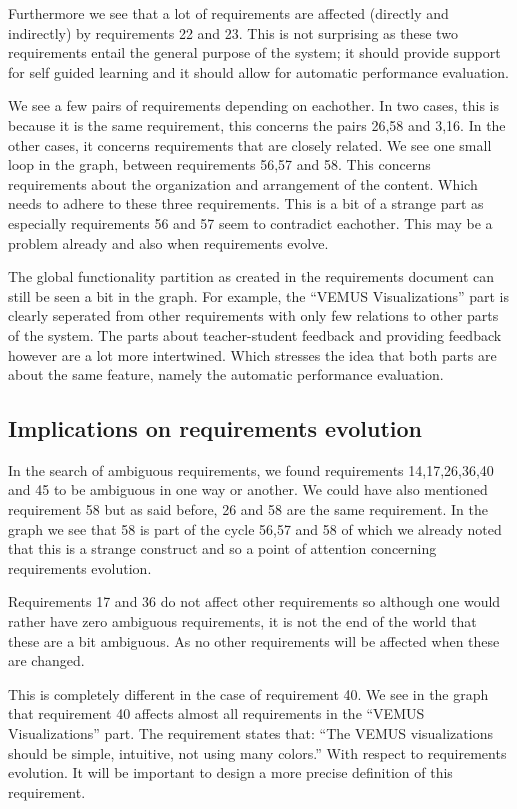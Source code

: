 \documentclass[a4paper,twoside, twocolumn,11pt]{article}
\numberwithin{equation}{section}
\begin{document}
Furthermore we see that a lot of requirements are affected (directly and indirectly) by requirements 22 and 23. This is not surprising as these two requirements entail the general purpose of the system; it should provide support for self guided learning and it should allow for automatic performance evaluation.

We see a few pairs of requirements depending on eachother. In two cases, this is because it is the same requirement, this concerns the pairs 26,58 and 3,16. In the other cases, it concerns requirements that are closely related. We see one small loop in the graph, between requirements 56,57 and 58. This concerns requirements about the organization and arrangement of the content. Which needs to adhere to these three requirements. This is a bit of a strange part as especially requirements 56 and 57 seem to contradict eachother. This may be a problem already and also when requirements evolve.

The global functionality partition as created in the requirements document can still be seen a bit in the graph. For example, the ``VEMUS Visualizations'' part is clearly seperated from other requirements with only few relations to other parts of the system. The parts about teacher-student feedback and providing feedback however are a lot more intertwined. Which stresses the idea that both parts are about the same feature, namely the automatic performance evaluation.

\subsection{Implications on requirements evolution}
In the search of ambiguous requirements, we found requirements 14,17,26,36,40 and 45 to be ambiguous in one way or another. We could have also mentioned requirement 58 but as said before, 26 and 58 are the same requirement. In the graph we see that 58 is part of the cycle 56,57 and 58 of which we already noted that this is a strange construct and so a point of attention concerning requirements evolution.

Requirements 17 and 36 do not affect other requirements so although one would rather have zero ambiguous requirements, it is not the end of the world that these are a bit ambiguous. As no other requirements will be affected when these are changed. 

This is completely different in the case of requirement 40. We see in the graph that requirement 40 affects almost all requirements in the ``VEMUS Visualizations'' part. The requirement states that: ``The VEMUS visualizations should be simple, intuitive, not using many colors.'' With respect to requirements evolution. It will be important to design a more precise definition of this requirement. 
\end{document}
